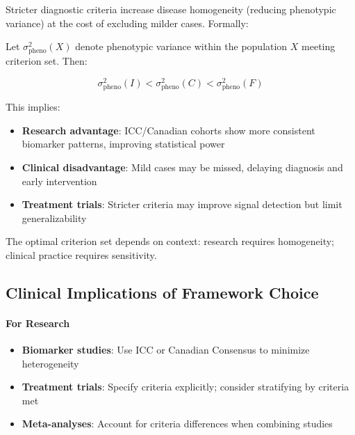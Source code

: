 \begin{hypothesis}
\label{hyp:specificity-homogeneity}
Stricter diagnostic criteria increase disease homogeneity (reducing phenotypic variance) at the cost of excluding milder cases. Formally:

Let $\sigma^2_{\text{pheno}}(X)$ denote phenotypic variance within the population $X$ meeting criterion set. Then:

\begin{equation}
\sigma^2_{\text{pheno}}(I) < \sigma^2_{\text{pheno}}(C) < \sigma^2_{\text{pheno}}(F)
\end{equation}

This implies:
\begin{itemize}
    \item \textbf{Research advantage}: ICC/Canadian cohorts show more consistent biomarker patterns, improving statistical power
    \item \textbf{Clinical disadvantage}: Mild cases may be missed, delaying diagnosis and early intervention
    \item \textbf{Treatment trials}: Stricter criteria may improve signal detection but limit generalizability
\end{itemize}

The optimal criterion set depends on context: research requires homogeneity; clinical practice requires sensitivity.
\end{hypothesis}

\subsection{Clinical Implications of Framework Choice}

\paragraph{For Research}
\begin{itemize}
    \item \textbf{Biomarker studies}: Use ICC or Canadian Consensus to minimize heterogeneity
    \item \textbf{Treatment trials}: Specify criteria explicitly; consider stratifying by criteria met
    \item \textbf{Meta-analyses}: Account for criteria differences when combining studies
\end{itemize}

